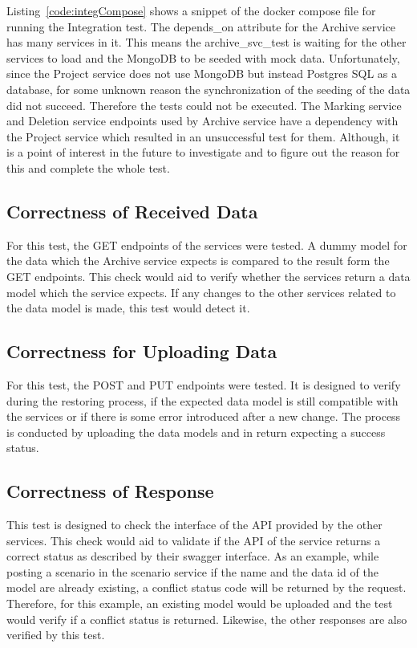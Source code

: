 Listing~\ref{code:integCompose} shows a snippet of the docker compose file for running the Integration test. The depends\_on attribute for the Archive service
has many services in it. This means the archive\_svc\_test is waiting for the other services to load and the MongoDB to be seeded with mock data. Unfortunately,
since the Project service does not use MongoDB but instead Postgres SQL as a database, for some unknown reason the synchronization of the seeding of the data
did not succeed. Therefore the tests could not be executed. The
Marking service and Deletion service endpoints used by Archive service have a dependency with the Project service which resulted in an unsuccessful test
for them. Although, it is a point of interest in the future to investigate and to figure out the reason for this and complete the whole test.

\subsection{Correctness of Received Data}
For this test, the GET endpoints of the services were tested. A dummy model for the data which the Archive service expects is compared to the result
form the GET endpoints. This check would aid to verify whether the services return a data model which the service expects. If any changes to the other services
related to the data model is made, this test would detect it. 

\subsection{Correctness for Uploading Data}
For this test, the POST and PUT endpoints were tested. It is designed to verify during the restoring process, if the expected data model 
is still compatible with the services or if there is some error introduced after a new change. The process is conducted by uploading the 
data models and in return expecting a success status.

\subsection{Correctness of Response}
This test is designed to check the interface of the API provided by the other services. This check would aid to validate if the API of the
service returns a correct status as described by their swagger interface. As an example, while posting a scenario in the scenario service if the
name and the data id of the model are already existing, a conflict status code will be returned by the request. Therefore, for this example, an existing
model would be uploaded and the test would verify if a conflict status is returned. Likewise, the other responses are also verified by this test. 

